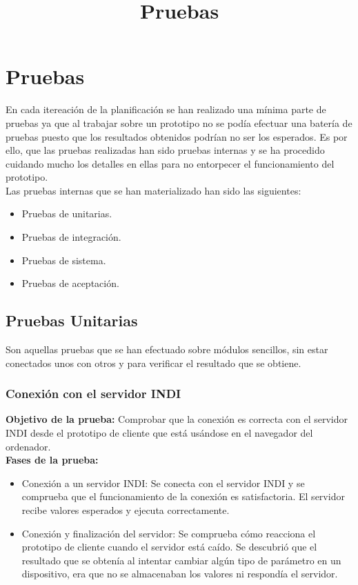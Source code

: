 \chapter{Pruebas}
\title{Pruebas}
\label{cap:Pruebas}

En cada itereación de la planificación se han realizado una mínima parte de pruebas ya que al trabajar sobre un prototipo no se podía efectuar una batería de pruebas puesto que los resultados obtenidos podrían no ser los esperados. Es por ello, que las pruebas realizadas han sido pruebas internas y se ha procedido cuidando mucho los detalles en ellas para no entorpecer el funcionamiento del prototipo.\\

Las pruebas internas que se han materializado han sido las siguientes:
\begin{itemize}
  \item Pruebas de unitarias.
  \item Pruebas de integración.
  \item Pruebas de sistema.
  \item Pruebas de aceptación.
\end{itemize}

\section{Pruebas Unitarias}
Son aquellas pruebas que se han efectuado sobre módulos sencillos, sin estar conectados unos con otros y para verificar el resultado que se obtiene.

\subsection{Conexión con el servidor INDI}
\textbf{Objetivo de la prueba:} Comprobar que la conexión es correcta con el servidor INDI desde el prototipo de cliente que está usándose en el navegador del ordenador.\\

\textbf{Fases de la prueba:}
\begin{itemize}
  \item Conexión a un servidor INDI: Se conecta con el servidor INDI y se comprueba que el funcionamiento de la conexión es satisfactoria. El servidor recibe valores esperados y ejecuta correctamente.
  \item Conexión y finalización del servidor: Se comprueba cómo reacciona el prototipo de cliente cuando el servidor está caído. Se descubrió que el resultado que se obtenía al intentar cambiar algún tipo de parámetro en un dispositivo, era que no se almacenaban los valores ni respondía el servidor.
\end{itemize}

